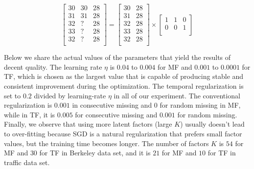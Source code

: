 \begin{equation}
\label{temporalSplit_matrix}
\begin{bmatrix}
30 & 30 & 28\\
31 & 31 & 28\\
32 &  ? & 28\\
33 &  ? & 28\\
32 &  ? & 28\\
\end{bmatrix} 
= 
\begin{bmatrix}
30 & 28\\
31 & 28\\
32 & 28\\
33 & 28\\
32 & 28\\
\end{bmatrix} 
\times
\begin{bmatrix}
1 & 1 & 0\\
0 & 0 & 1\\
\end{bmatrix} 
\end{equation}

Below we share the actual values of the parameters that yield the results of decent quality.
The learning rate $\eta$ is $0.04$ to $0.004$ for MF and $0.001$ to $0.0001$ for TF, which is chosen as the largest value that is capable of producing stable and consistent improvement during the optimization.
The temporal regularization is set to $0.2$ divided by learning-rate $\eta$ in all of our experiment.
The conventional regularization is $0.001$ in consecutive missing and $0$ for random missing in MF, while in TF, it is $0.005$ for consecutive missing and $0.001$ for random missing.
Finally, we observe that using more latent factors (large $K$) usually doesn't lead to over-fitting because SGD is a natural regularization that prefers small factor values, but the training time becomes longer.
The number of factors $K$ is $54$ for MF and $30$ for TF in Berkeley data set, and it is $21$ for MF and $10$ for TF in traffic data set. 

